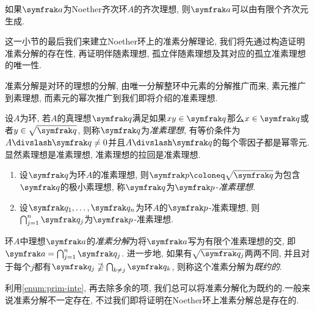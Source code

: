 \begin{propositionnoproof}
  如果$\ideal{a}$为Noether齐次环$A$的齐次理想, 则$\ideal{a}$可以由有限个齐次元生成.
\end{propositionnoproof}

这一小节的最后我们来建立Noether环上的准素分解理论, 我们将先通过构造证明准素分解的存在性, 再证明伴随素理想, 孤立伴随素理想及其对应的孤立准素理想的唯一性.

准素分解是对环的理想的分解, 由唯一分解整环中元素的分解推广而来, 素元推广到素理想, 而素元的幂次推广到我们即将介绍的准素理想.

\begin{definition}
  设$A$为环, 若$A$的真理想$\ideal{q}$满足如果$xy\in \ideal{q}$那么$x\in\ideal{q}$或者$y\in\sqrt{\ideal{q}}$, 则称$\ideal{q}$为\emph{准素理想}, 有等价条件为$A{\divslash}\ideal{q}\neq 0$并且$A{\divslash}\ideal{q}$的每个零因子都是幂零元. 显然素理想是准素理想, 准素理想的拉回是准素理想.
\end{definition}

\begin{propositionnoproof}\label{prop:primary}\leavevmode
  \begin{enumerate}
    \item 设$\ideal{q}$为环$A$的准素理想, 则$\ideal{p}\coloneq \sqrt{\ideal{q}}$为包含$\ideal{q}$的极小素理想, 称$\ideal{q}$为$\ideal{p}$-\emph{准素理想}.
    \item\label{enum:prim-inte} 设$\ideal{q}_1, \dotsc, \ideal{q}_n$为环$A$的$\ideal{p}$-准素理想, 则$\bigcap_{j=1}^n\ideal{q}_j$为$\ideal{p}$-准素理想.
  \end{enumerate}
\end{propositionnoproof}


\begin{definition}
  环$A$中理想$\ideal{a}$的\emph{准素分解}为将$\ideal{a}$写为有限个准素理想的交, 即$\ideal{a}=\bigcap_{j=1}^n\ideal{q}_j$. 进一步地, 如果有$\sqrt{\ideal{q}_j}$两两不同, 并且对于每个$j$都有$\ideal{q}_j\nsupseteq\bigcap_{k\neq j}\ideal{q}_k$, 则称这个准素分解为\emph{既约的}.
\end{definition}

利用\ref{enum:prim-inte}, 再去除多余的项, 我们总可以将准素分解化为既约的.一般来说准素分解不一定存在, 不过我们即将证明在Noether环上准素分解总是存在的.

